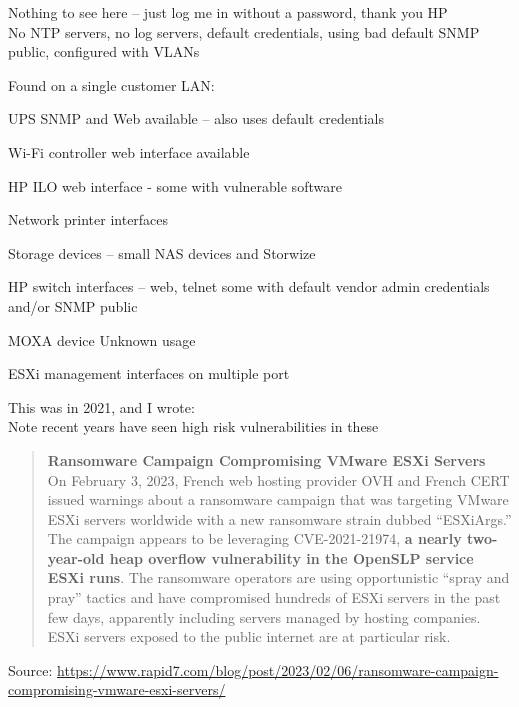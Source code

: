 \documentclass[Screen16to9,17pt]{foils}
\begin{document}
\begin{list2}
\item Nothing to see here -- just log me in without a password, thank you HP\\
No NTP servers, no log servers, default credentials, using bad default SNMP public, configured with VLANs
\end{list2}



Found on a single customer LAN:
\begin{list2}
\item UPS SNMP and Web available – also uses default credentials
\item Wi-Fi controller web interface available
\item HP ILO web interface - some with vulnerable software
\item Network printer interfaces
\item Storage devices – small NAS devices and Storwize
\item HP switch interfaces – web, telnet some with default vendor admin credentials and/or SNMP public
\item MOXA device Unknown usage
\item ESXi management interfaces on multiple port
\end{list2}

This was in 2021, and I wrote:\\
Note recent years have seen high risk vulnerabilities in these




\begin{quote}{\bf
Ransomware Campaign Compromising VMware ESXi Servers}\\
On February 3, 2023, French web hosting provider OVH and French CERT issued warnings about a ransomware campaign that was targeting VMware ESXi servers worldwide with a new ransomware strain dubbed “ESXiArgs.” The campaign appears to be leveraging CVE-2021-21974, {\bf a nearly two-year-old heap overflow vulnerability in the OpenSLP service ESXi runs}. The ransomware operators are using opportunistic “spray and pray” tactics and have compromised hundreds of ESXi servers in the past few days, apparently including servers managed by hosting companies. ESXi servers exposed to the public internet are at particular risk.
\end{quote}
Source: \url{https://www.rapid7.com/blog/post/2023/02/06/ransomware-campaign-compromising-vmware-esxi-servers/}
\end{document}
